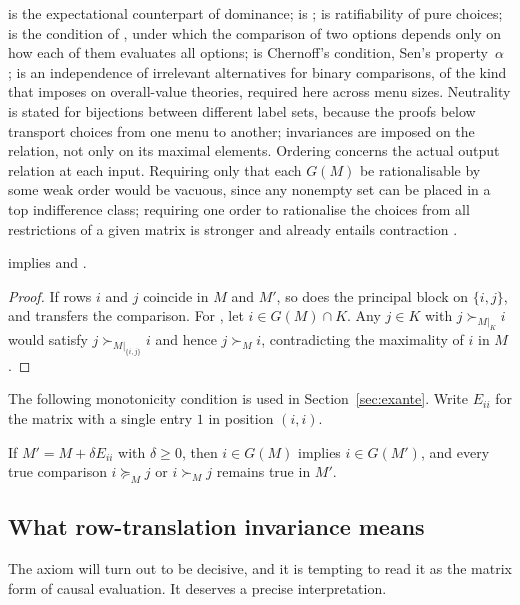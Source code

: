  is the expectational counterpart of dominance;  is ;  is ratifiability of
pure choices;  is the condition of \textcite[§6]{briggs2010}, under which the comparison of two
options depends only on how each of them evaluates all options;  is Chernoff's condition, Sen's
property~$\alpha$ \autocite{chernoff1954,sen1971};  is an independence of irrelevant alternatives
for binary comparisons, of the kind that \textcite{podgorski2022} imposes on overall-value theories,
required here across menu sizes. Neutrality is
stated for bijections between different label sets, because the proofs below transport choices from
one menu to another; invariances are imposed on the relation, not only on its maximal elements.
Ordering concerns the actual output relation at each input. Requiring only that each $G(M)$ be
rationalisable by some weak order would be vacuous, since any nonempty set can be placed in a top
indifference class; requiring one order to rationalise the choices from all restrictions of a
given matrix is stronger and already entails contraction \autocite{arrow1959}.

\begin{lemma}\label{lem:bimplies}
 implies  and .
\end{lemma}

\begin{proof}
If rows $i$ and $j$ coincide in $M$ and $M'$, so does the principal block on $\{i,j\}$, and 
transfers the comparison. For , let $i\in G(M)\cap K$. Any $j\in K$ with $j\succ_{M|_K}i$ would
satisfy $j\succ_{M|_{\{i,j\}}}i$ and hence $j\succ_Mi$, contradicting the maximality of $i$ in $M$.
\end{proof}

The following monotonicity condition is used in Section~\ref{sec:exante}. Write $E_{ii}$ for the
matrix with a single entry $1$ in position $(i,i)$.

\begin{definition}
If $M'=M+\delta E_{ii}$ with $\delta\ge0$, then $i\in G(M)$ implies $i\in G(M')$, and every true
comparison $i\succeq_Mj$ or $i\succ_Mj$ remains true in $M'$.
\end{definition}

\subsection{What row-translation invariance means}

The axiom  will turn out to be decisive, and it is tempting to read it as the matrix form of
causal evaluation. It deserves a precise interpretation.

